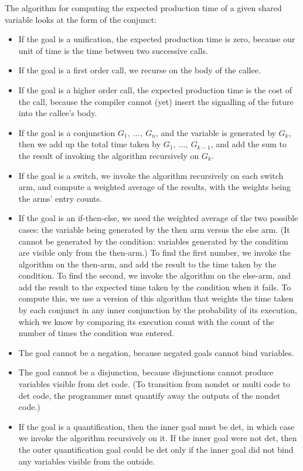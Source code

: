 The algorithm for computing the expected production time
of a given shared variable looks at the form of the conjunct:
\begin{itemize}
\item
If the goal is a unification,
the expected production time is zero,
because our unit of time is the time between two successive calls.
\item
If the goal is a first order call,
we recurse on the body of the callee.
\item
If the goal is a higher order call,
the expected production time is the cost of the call,
because the compiler cannot (yet) insert
the signalling of the future into the callee's body.
\item
If the goal is a conjunction $G_1,~\ldots,~G_n$,
and the variable is generated by $G_k$,
then we add up the total time taken by $G_1,~\ldots,~G_{k-1}$,
and add the sum to the result of invoking the algorithm recursively on $G_k$.
\item
If the goal is a switch,
we invoke the algorithm recursively on each switch arm,
and compute a weighted average of the results,
with the weights being the arms' entry counts.
\item
If the goal is an if-then-else,
we need the weighted average of the two possible cases:
the variable being generated by the then arm versus the else arm.
(It cannot be generated by the condition:
variables generated by the condition are visible only from the then-arm.)
To find the first number,
we invoke the algorithm on the then-arm,
and add the result to the time taken by the condition.
To find the second,
we invoke the algorithm on the else-arm,
and add the result to the expected time taken by the condition when it fails.
To compute this, we use a version of this algorithm
that weights the time taken by each conjunct in any inner conjunction
by the probability of its execution,
which we know by comparing its execution count
with the count of the number of times the condition was entered.
\item
The goal cannot be a negation, because negated goals cannot bind variables.
\item
The goal cannot be a disjunction, because
disjunctions cannot produce variables visible from det code.
(To transition from nondet or multi code to det code,
the programmer must quantify away the outputs of the nondet code.)
\item
If the goal is a quantification,
then the inner goal must be det,
in which case we invoke the algorithm recursively on it.
If the inner goal were not det,
then the outer quantification goal could be det
only if the inner goal did not bind any variables visible from the outside.
\end{itemize}

